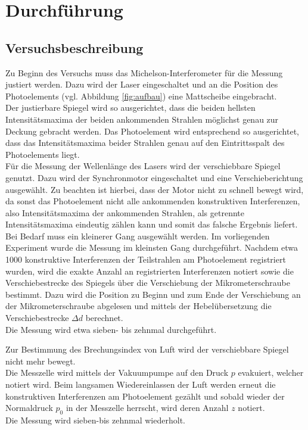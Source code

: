\section{Durchführung}
\label{sec:Durchführung}



\subsection{Versuchsbeschreibung}
\label{sec:Versuchsbeschreibung}
Zu Beginn des Versuchs muss das Michelson-Interferometer für die Messung justiert werden.
Dazu wird der Laser eingeschaltet und an die Position des Photoelements (vgl. Abbildung \ref{fig:aufbau}) eine Mattscheibe eingebracht.\\
Der justierbare Spiegel wird so ausgerichtet, dass die beiden hellsten Intensitätsmaxima der beiden ankommenden Strahlen möglichst genau zur Deckung gebracht werden. Das Photoelement wird entsprechend so ausgerichtet, dass das Intensitätsmaxima beider Strahlen genau auf den Eintrittsspalt des Photoelements liegt.
\\Für die Messung der Wellenlänge des Lasers wird der verschiebbare Spiegel genutzt.
Dazu wird der Synchronmotor eingeschaltet und eine Verschieberichtung ausgewählt.
Zu beachten ist hierbei, dass der Motor nicht zu schnell bewegt wird, da sonst das Photoelement nicht alle ankommenden konstruktiven Interferenzen, also Intensitätsmaxima der ankommenden Strahlen, als getrennte Intensitätsmaxima eindeutig zählen kann und somit das falsche Ergebnis liefert.
\\Bei Bedarf muss ein kleinerer Gang ausgewählt werden. Im vorliegenden Experiment wurde die Messung im kleinsten Gang durchgeführt.
Nachdem etwa 1000 konstruktive Interferenzen der Teilstrahlen am Photoelement registriert wurden, wird die exakte Anzahl an registrierten Interferenzen notiert sowie die Verschiebestrecke des Spiegels über die Verschiebung der Mikrometerschraube bestimmt. Dazu wird die Position zu Beginn und zum Ende der Verschiebung an der Mikrometerschraube abgelesen und mittels der Hebelübersetzung die Verschiebestrecke $\Delta d$ berechnet.
\\Die Messung wird etwa sieben- bis zehnmal durchgeführt.

Zur Bestimmung des Brechungsindex von Luft wird der verschiebbare Spiegel nicht mehr bewegt.\\
Die Messzelle wird mittels der Vakuumpumpe auf den Druck $p$ evakuiert, welcher notiert wird. Beim langsamen Wiedereinlassen der Luft werden erneut die konstruktiven Interferenzen am Photoelement gezählt und sobald wieder der Normaldruck $p_{\mathrm{0}}$ in der Messzelle herrscht, wird deren Anzahl $z$ notiert. \\Die Messung wird sieben-bis zehnmal wiederholt.

